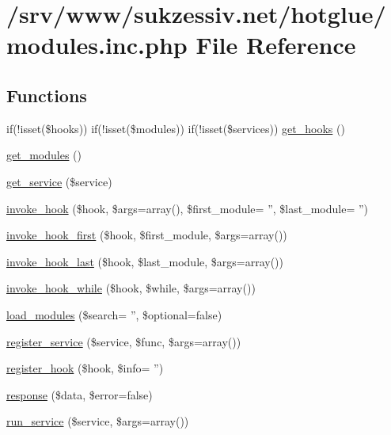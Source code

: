 \hypertarget{modules_8inc_8php}{
\section{/srv/www/sukzessiv.net/hotglue/modules.inc.php File Reference}
\label{modules_8inc_8php}
}
\subsection*{Functions}
\begin{CompactItemize}
\item 
if(!isset(\$hooks)) if(!isset(\$modules)) if(!isset(\$services)) \hyperlink{modules_8inc_8php_dcaa12e356133b7fa0670571698b38cc}{get\_\-hooks} ()
\item 
\hyperlink{modules_8inc_8php_1b73e435e11b07906d0781b146b4aa21}{get\_\-modules} ()
\item 
\hyperlink{modules_8inc_8php_bf7633223c2fd4ecb199a8e0dc070802}{get\_\-service} (\$service)
\item 
\hyperlink{modules_8inc_8php_92ef7c094f294cfec43a3bb53227a21a}{invoke\_\-hook} (\$hook, \$args=array(), \$first\_\-module= '', \$last\_\-module= '')
\item 
\hyperlink{modules_8inc_8php_cac937809bdb98ce29616134e43050ed}{invoke\_\-hook\_\-first} (\$hook, \$first\_\-module, \$args=array())
\item 
\hyperlink{modules_8inc_8php_e1ff036fae9d272fe1d58dff8a9caed2}{invoke\_\-hook\_\-last} (\$hook, \$last\_\-module, \$args=array())
\item 
\hyperlink{modules_8inc_8php_66473fc9f24153d85053f1f9c6ed83e4}{invoke\_\-hook\_\-while} (\$hook, \$while, \$args=array())
\item 
\hyperlink{modules_8inc_8php_23f8be02dc2148a3c860119a1d6ea276}{load\_\-modules} (\$search= '', \$optional=false)
\item 
\hyperlink{modules_8inc_8php_e6ed600fb2ce39a4b0837bbb01fe8d6e}{register\_\-service} (\$service, \$func, \$args=array())
\item 
\hyperlink{modules_8inc_8php_d91a5f96df0655d782404170324e567d}{register\_\-hook} (\$hook, \$info= '')
\item 
\hyperlink{modules_8inc_8php_361058ff2a03c098045c4442440a2574}{response} (\$data, \$error=false)
\item 
\hyperlink{modules_8inc_8php_3d581f1636df2e24ffe7b013a12fb1db}{run\_\-service} (\$service, \$args=array())
\end{CompactItemize}


